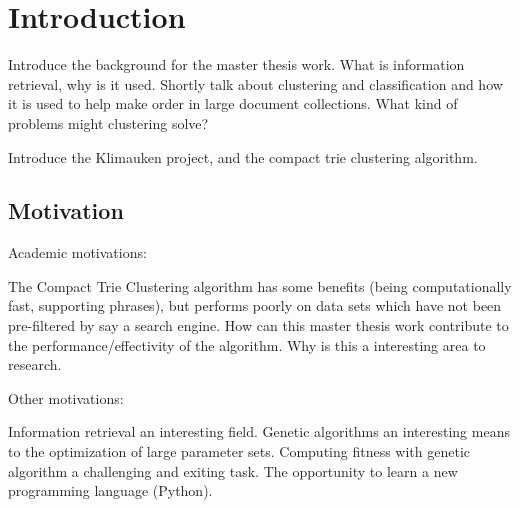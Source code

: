 
\chapter{Introduction} %

\label{Introduction}



Introduce the background for the master thesis work. What is information retrieval, why is it used. Shortly talk about clustering and classification and how it is used to help make order in large document collections. What kind of problems might clustering solve?

Introduce the Klimauken project, and the compact trie clustering algorithm.



\section{Motivation}
Academic motivations:

The Compact Trie Clustering algorithm has some benefits (being computationally fast, supporting phrases), but performs poorly on data sets which have not been pre-filtered by say a search engine. How can this master thesis work contribute to the performance/effectivity of the algorithm. Why is this a interesting area to research.

Other motivations:

Information retrieval an interesting field. Genetic algorithms an interesting means to the optimization of large parameter sets. Computing fitness with genetic algorithm a challenging and exiting task. The opportunity to learn a new programming language (Python).

